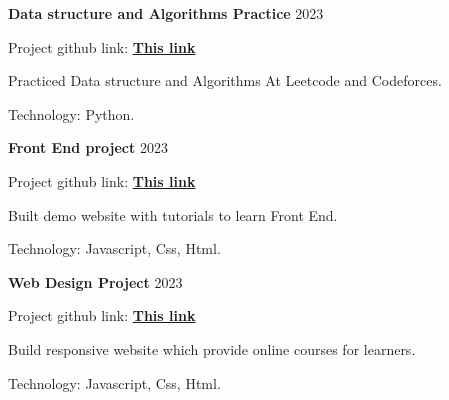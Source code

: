  \begin{cventries} %
 \cvsimpleentry
     {\textbf{Data structure and Algorithms Practice}} %
     {2023} %
     {
       \begin{cvitems} %
       \item {Project github link: \href{https://github.com/TrucNgoc11/DSA}{\textbf{This link}}}
         \item {Practiced Data structure and Algorithms At Leetcode and Codeforces.}
         \item {Technology: Python.}
       \end{cvitems}
     }

    \cvsimpleentry
     {\textbf{Front End project}} %
     {2023} %
     {
       \begin{cvitems} %
        \item {Project github link: \href{https://github.com/TrucNgoc11/Demo_Codegym}{\textbf{This link}}}
         \item {Built demo website with tutorials to learn Front End.}
         \item {Technology: Javascript, Css, Html.}
       \end{cvitems}
     }

     \cvsimpleentry
     {\textbf{Web Design Project}} %
     {2023} %
     {
       \begin{cvitems} %
        \item {Project github link: \href{https://github.com/TrucNgoc11/educational-website-project}{\textbf{This link}}}
         \item {Build responsive website which provide online courses for learners.}
         \item {Technology: Javascript, Css, Html.}
       \end{cvitems}
     }

\end{cventries}
